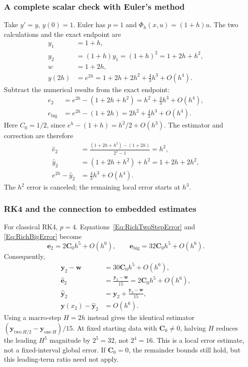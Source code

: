\subsubsection{A complete scalar check with Euler's method}
Take $y'=y$, $y(0)=1$. Euler has $p=1$ and $\Phi_h(x,u)=(1+h)u$.
The two calculations and the exact endpoint are
\begin{equation}\label{Eq:RichEulerEndpoints}
\begin{aligned}
 y_1&=1+h,\\
 y_2&=(1+h)y_1=(1+h)^2=1+2h+h^2,\\
 w&=1+2h,\\
 y(2h)&=e^{2h}=1+2h+2h^2+\tfrac43h^3+O(h^4).
\end{aligned}
\end{equation}
Subtract the numerical results from the exact endpoint:
\[
\begin{aligned}
 e_2&=e^{2h}-(1+2h+h^2)=h^2+\tfrac43h^3+O(h^4),\\
 e_{\mathrm{big}}&=e^{2h}-(1+2h)=2h^2+\tfrac43h^3+O(h^4).
\end{aligned}
\]
Here $C_0=1/2$, since $e^h-(1+h)=h^2/2+O(h^3)$.
The estimator and correction are therefore
\begin{equation}\label{Eq:RichEulerCorrection}
\begin{aligned}
 \widehat e_2&=\frac{(1+2h+h^2)-(1+2h)}{2^1-1}=h^2,\\
 \widehat y_2&=(1+2h+h^2)+h^2=1+2h+2h^2,\\
 e^{2h}-\widehat y_2&=\tfrac43h^3+O(h^4).
\end{aligned}
\end{equation}
The $h^2$ error is canceled; the remaining local error starts at $h^3$.

\subsubsection{RK4 and the connection to embedded estimates}
For classical RK4, $p=4$. Equations~\ref{Eq:RichTwoStepError} and
\ref{Eq:RichBigError} become
\[
 \mathbf e_2=2\mathbf C_0h^5+O(h^6),\qquad
 \mathbf e_{\mathrm{big}}=32\mathbf C_0h^5+O(h^6).
\]
Consequently,
\begin{equation}\label{Eq:RichRK4Factor}
\begin{aligned}
 \mathbf y_2-\mathbf w&=30\mathbf C_0h^5+O(h^6),\\
 \widehat{\mathbf e}_2&=\frac{\mathbf y_2-\mathbf w}{15}
                  =2\mathbf C_0h^5+O(h^6),\\
 \widehat{\mathbf y}_2&=\mathbf y_2+\frac{\mathbf y_2-\mathbf w}{15},\\
 \mathbf y(x_2)-\widehat{\mathbf y}_2&=O(h^6).
\end{aligned}
\end{equation}
Using a macro-step $H=2h$ instead gives the identical estimator
$(\mathbf y_{\mathrm{two}\ H/2}-\mathbf y_{\mathrm{one}\ H})/15$.
At fixed starting data with $\mathbf C_0\neq0$, halving $H$ reduces the
leading $H^5$ magnitude by $2^5=32$, not $2^4=16$. This is a local error
estimate, not a fixed-interval global error. If $\mathbf C_0=0$, the remainder
bounds still hold, but this leading-term ratio need not apply.


